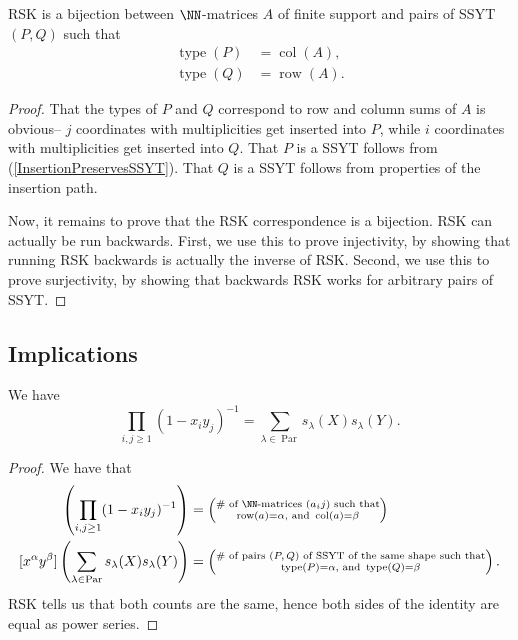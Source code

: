 \documentclass{article}
\DeclareMathOperator{\row}{row}
\DeclareMathOperator{\col}{col}
\DeclareMathOperator{\type}{type}
\DeclareMathOperator{\Par}{Par}
\begin{document}
\begin{theorem}
    RSK is a bijection between $\NN$-matrices $A$ of finite support and pairs of SSYT $(P,Q)$ such that
    \begin{align*}
        \type(P) &= \col(A), \\
        \type(Q) &= \row(A).
    \end{align*}
\end{theorem}

\begin{proof}
    That the types of $P$ and $Q$ correspond to row and column sums of $A$ is obvious-- $j$ coordinates with multiplicities get inserted into $P$, while $i$ coordinates with multiplicities get inserted into $Q$.
    That $P$ is a SSYT follows from (\ref{InsertionPreservesSSYT}).
    That $Q$ is a SSYT follows from properties of the insertion path.

    Now, it remains to prove that the RSK correspondence is a bijection. 
    RSK can actually be run backwards. 
    First, we use this to prove injectivity, by showing that running RSK backwards is actually the inverse of RSK. 
    Second, we use this to prove surjectivity, by showing that backwards RSK works for arbitrary pairs of SSYT.

\end{proof}

\subsection{Implications}


\begin{theorem}    We have
    \begin{equation}\label{eq:CauchyIdentityForSchurs}
        \prod_{i,j \geq 1}(1-x_iy_j)^{-1} = \sum_{\lambda \in \Par}s_\lambda(X) s_\lambda(Y).     
    \end{equation}
\end{theorem}

\begin{proof}
    We have that
    \begin{align*}
        [x^\alpha y^\beta]\left(\prod_{i,j\geq1}(1-x_iy_j)^{-1}\right) &= \left(\substack{\#\text{ of $\NN$-matrices $(a_ij)$ such that}\\\row(a) = \alpha\text{, and }\col(a) = \beta}\right) \\
        [x^\alpha y^\beta]\left(\sum_{\lambda\in\Par} s_\lambda(X) s_\lambda(Y) \right) &= \left(\substack{\#\text{ of pairs $(P,Q)$ of SSYT of the same shape such that}\\\type(P) = \alpha\text{, and }\type(Q) = \beta}\right).
    \end{align*}
    RSK tells us that both counts are the same, hence both sides of the identity are equal as power series.
\end{proof}
\end{document}
